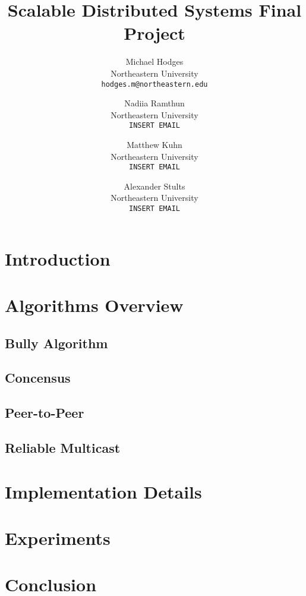 \documentclass[10pt,twocolumn,letterpaper]{article}
\begin{document}
\title{Scalable Distributed Systems Final Project}

\author{Michael Hodges\\
Northeastern University\\
{\tt\small hodges.m@northeastern.edu}
\and 
Nadiia Ramthun\\
Northeastern University\\
{\tt\small INSERT EMAIL}
\and
Matthew Kuhn\\
Northeastern University\\
{\tt\small INSERT EMAIL}
\and
Alexander Stults\\
Northeastern University\\
{\tt\small INSERT EMAIL}
}

\maketitle

\section{Introduction}
\section{Algorithms Overview}
\subsection{Bully Algorithm}
\subsection{Concensus}
\subsection{Peer-to-Peer}
\subsection{Reliable Multicast}
\section{Implementation Details}
\section{Experiments}
\section{Conclusion}
    
{\small


}
\end{document}

